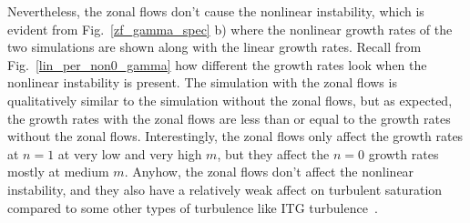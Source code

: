 Nevertheless, the zonal flows don't cause the nonlinear instability, which is evident from Fig.~\ref{zf_gamma_spec} b) where the nonlinear growth rates of the two simulations are shown
along with the linear growth rates. Recall from Fig.~\ref{lin_per_non0_gamma} how different the growth rates look when the nonlinear instability is present.
The simulation with the zonal flows is qualitatively similar to the simulation without the zonal flows, but as expected, the growth rates with the zonal flows are less than or equal to
the growth rates without the zonal flows. Interestingly, the zonal flows only affect the growth rates at $n=1$ at very low and very high $m$, but they affect the $n=0$ growth rates
mostly at medium $m$. Anyhow, the zonal flows don't affect the nonlinear instability, and they also have a relatively weak affect on turbulent saturation compared to some other types
of turbulence like ITG turbulence~\cite{dimits2000,Holland2003}.

